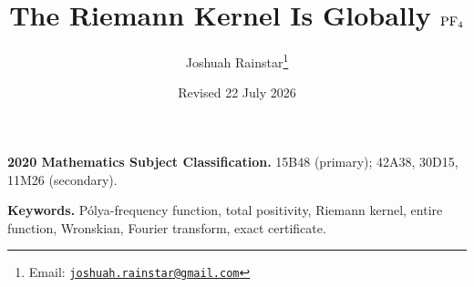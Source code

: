 \documentclass[11pt]{article}
\title{The Riemann Kernel Is Globally \texorpdfstring{$\mathrm{PF}_4$}{PF4}}
\author{Joshuah Rainstar\thanks{Email:
\href{mailto:joshuah.rainstar@gmail.com}{\texttt{joshuah.rainstar@gmail.com}}}}
\date{Revised 22 July 2026}
\begin{document}
\maketitle

\noindent\textbf{2020 Mathematics Subject Classification.}
15B48 (primary); 42A38, 30D15, 11M26 (secondary).

\noindent\textbf{Keywords.}
P\'olya-frequency function, total positivity, Riemann kernel, entire function,
Wronskian, Fourier transform, exact certificate.
\tableofcontents
















\appendix



\end{document}
